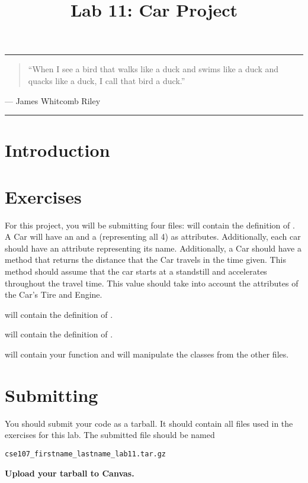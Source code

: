 \documentclass[11pt]{cselabheader}
\title{Lab 11: Car Project}
\begin{document}
\maketitle

\hrule
\begin{quotation}
  ``When I see a bird that walks like a duck and swims like a duck and quacks like
  a duck, I call that bird a duck.''
\end{quotation}
\begin{flushright}
  --- James Whitcomb Riley
\end{flushright}

\hrule

\section{Introduction}


\clearpage
\section{Exercises}
\label{sec:ex}

\begin{ex}
  For this project, you will be submitting four files:
   will contain the definition of . A
  Car will have an  and a   (representing all 4)
  as attributes. Additionally, each car should have an attribute representing its name.
  Additionally, a Car should have a method  that returns
  the distance that the Car travels in the time given. This method should assume that
  the car starts at a standstill and accelerates throughout the travel time. This value
  should take into account the attributes of the Car's Tire and Engine.
  
   will contain the definition of .
  
   will contain the definition of .

   will contain your  function and will
  manipulate the classes from the other files.
\end{ex}

\pagebreak
\section{Submitting}
You should submit your code as a tarball. It should contain all files
used in the exercises for this lab. The submitted file should be named
\begin{center}
  \texttt{cse107\_firstname\_lastname\_lab11.tar.gz}
\end{center}

\begin{center}
  \textbf{Upload your tarball to Canvas.}
\end{center}

\listoftheorems
\end{document}
